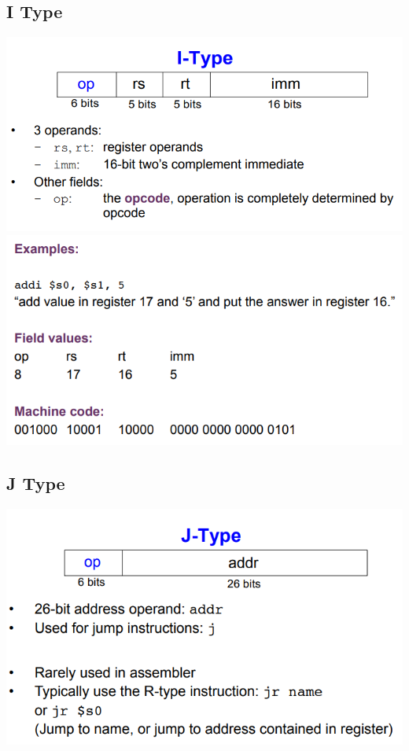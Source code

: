 \documentclass{article}[18pt]
\begin{document}
\subsection{I Type}
\includegraphics[scale=0.7]{I-Type}\\
\includegraphics[scale=0.7]{I-Type1}\\
\subsection{J Type}
\includegraphics[scale=0.7]{J-Type}
\end{document}
